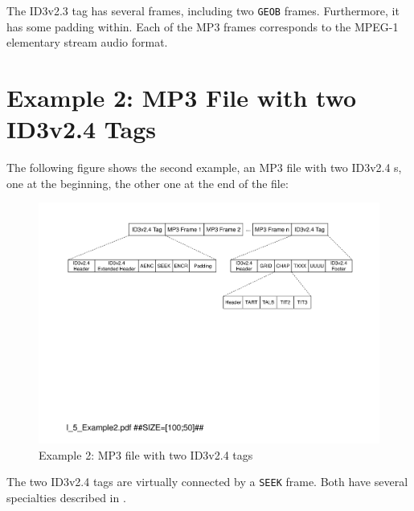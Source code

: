 The ID3v2.3 tag has several frames, including two \texttt{GEOB} frames. Furthermore, it has some padding within. Each of the MP3 frames corresponds to the MPEG-1 elementary stream audio format.


\section{Example 2: MP3 File with two ID3v2.4 Tags}
\label{sec:Example2MP3FileWithID3v23AndID3v11}

The following figure shows the second example, an MP3 file with two ID3v2.4 \TERMtag{}s, one at the beginning, the other one at the end of the file:

\begin{figure}[H]
\centering
\includegraphics[width=1.00\textwidth]{figures/I_Example2.pdf}
\caption{Example 2: MP3 file with two ID3v2.4 tags}
\label{fig:Example1MP3filewithtwoID3tags}
\end{figure}

The two ID3v2.4 tags are virtually connected by a \texttt{SEEK} frame. Both have several specialties described in \cite{MC17}.


